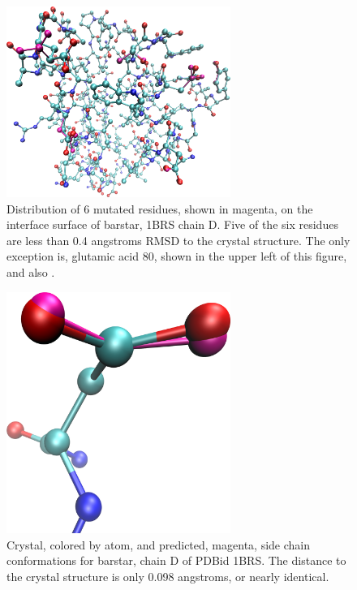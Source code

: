 \begin{figure}[h]
  \centering
  \includegraphics[width=0.65\textwidth,height=0.3\textheight,keepaspectratio]{figures/mutation_side_chain_images/1brs_all.png}
  \caption{Distribution of 6 mutated residues, shown in magenta, on the interface surface of barstar, 1BRS chain D.
Five of the six residues are less than 0.4 angstroms RMSD to the crystal structure.
The only exception is, glutamic acid 80, shown in the upper left of this figure, and also \protect\cite{figure:computational_mutation_scanning/1brs_d_80}.}
  \label{figure:computational_mutation_scanning/figname}
\end{figure}

\begin{figure}[h]
  \centering
  \includegraphics[width=0.65\textwidth,height=0.3\textheight,keepaspectratio]{figures/mutation_side_chain_images/1brs_chain_d_35.png}
  \caption{Crystal, colored by atom, and predicted, magenta, side chain conformations for barstar, chain D of PDBid 1BRS.
The distance to the crystal structure is only 0.098 angstroms, or nearly identical.}
  \label{figure:computational_mutation_scanning/figname}
\end{figure}

